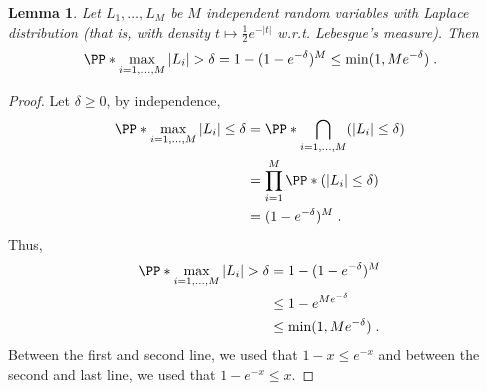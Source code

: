 \documentclass{article}
\newcommand{\1}{\mathds{1}}
\DeclarePairedDelimiter{\paren}{\lparen}{\rparen}
\theoremstyle{plain}
\newtheorem{lemma}{Lemma}[section]
\theoremstyle{definition}
\theoremstyle{remark}
\begin{document}
\begin{lemma}
\label{lemma:maximumlaplace}
    Let $L_1, \dots, L_{M}$ be $M$ independent random variables with Laplace distribution (that is, with density $t \mapsto \frac{1}{2} e^{- |t|}$ w.r.t. Lebesgue's measure). Then 
    \begin{equation}
        \PP*{\max_{i = 1 , \dots, M} |L_i| > \delta  } = 1 - \paren{1 - e^{-\delta}}^M \leq  \min(1, M e^{-\delta})  \;.
    \end{equation}
\end{lemma}
\begin{proof}
Let $\delta \geq 0$, by independence,
\begin{equation}
\begin{aligned}
    \PP*{\max_{i = 1 , \dots, M} |L_i| \leq \delta } 
    &= \PP*{\bigcap_{i = 1 , \dots, M} (|L_i| \leq \delta) } \\
    &= \prod_{i = 1}^M \PP*{ (|L_i| \leq \delta) } \\
    &= \paren{1 - e^{-\delta}}^M \;.
\end{aligned}
\end{equation}
Thus, 
\begin{equation}
\begin{aligned}
    \PP*{\max_{i = 1 , \dots, M} |L_i| > \delta  }
    &=
    1 - \paren{1 - e^{-\delta}}^M \\
    &\leq 1 - e^{Me^{-\delta}} \\
    &\leq \min(1, M e^{-\delta}) \;.
\end{aligned}
\end{equation}
Between the first and second line, we used that $1-x \leq e^{-x}$ and between the second and last line, we used that $1-e^{-x} \leq x$.
\end{proof}
\end{document}
